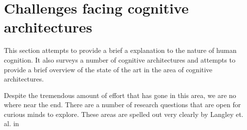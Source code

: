 
\section{Challenges facing cognitive architectures}

This section attempts to provide a brief a explanation to the nature
of human cognition. It also surveys a number of cognitive
architectures and attempts to provide a brief overview of the state of
the art in the area of cognitive architectures. 


Despite the tremendous amount of effort that has gone in this area, we
are no where near the end. There are a number of research questions
that are open for curious minds to explore. These areas are spelled
out very clearly by Langley et. al. in \cite{citeulike:4182324}


